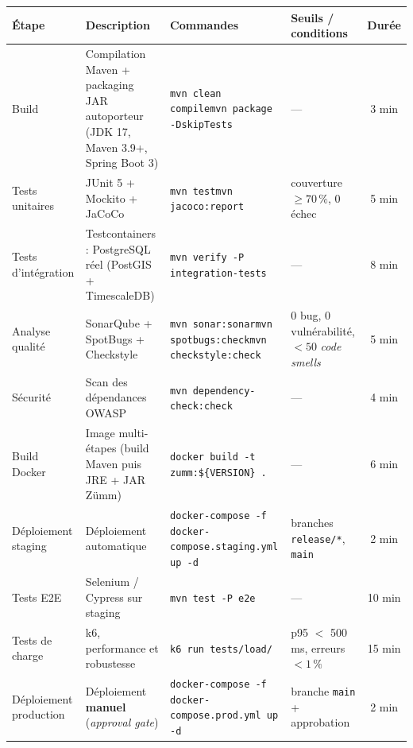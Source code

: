 \begin{center}
\small
\setlength{\tabcolsep}{4pt}%
\begin{tabular}{p{2.3cm}p{4.4cm}p{4.7cm}p{3.0cm}c}
\toprule
\textbf{Étape} & \textbf{Description} & \textbf{Commandes} & \textbf{Seuils / conditions} & \textbf{Durée} \\
\midrule
Build & Compilation Maven + packaging JAR autoporteur (JDK 17, Maven 3.9+, Spring Boot 3)
  & \texttt{mvn clean compile}\newline \texttt{mvn package -DskipTests}
  & --- & 3 min \\
\addlinespace
Tests unitaires & JUnit 5 + Mockito + JaCoCo
  & \texttt{mvn test}\newline \texttt{mvn jacoco:report}
  & couverture $\geq 70\,\%$, 0 échec & 5 min \\
\addlinespace
Tests d'intégration & Testcontainers : PostgreSQL réel (PostGIS + TimescaleDB)
  & \texttt{mvn verify -P integration-tests}
  & --- & 8 min \\
\addlinespace
Analyse qualité & SonarQube + SpotBugs + Checkstyle
  & \texttt{mvn sonar:sonar}\newline \texttt{mvn spotbugs:check}\newline \texttt{mvn checkstyle:check}
  & 0 bug, 0 vulnérabilité, $<50$ \emph{code smells} & 5 min \\
\addlinespace
Sécurité & Scan des dépendances OWASP
  & \texttt{mvn dependency-check:check}
  & --- & 4 min \\
\addlinespace
Build Docker & Image multi-étapes (build Maven puis JRE + JAR Zümm)
  & \texttt{docker build -t zumm:\$\{VERSION\} .}
  & --- & 6 min \\
\addlinespace
Déploiement staging & Déploiement automatique
  & \texttt{docker-compose -f docker-compose.staging.yml up -d}
  & branches \texttt{release/*}, \texttt{main} & 2 min \\
\addlinespace
Tests E2E & Selenium / Cypress sur staging
  & \texttt{mvn test -P e2e}
  & --- & 10 min \\
\addlinespace
Tests de charge & k6, performance et robustesse
  & \texttt{k6 run tests/load/}
  & p95 $<$ 500 ms, erreurs $<1\,\%$ & 15 min \\
\addlinespace
Déploiement production & Déploiement \textbf{manuel} (\emph{approval gate})
  & \texttt{docker-compose -f docker-compose.prod.yml up -d}
  & branche \texttt{main} + approbation & 2 min \\
\bottomrule
\end{tabular}
\end{center}


